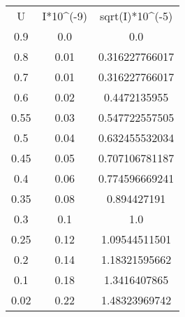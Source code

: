\begin{table}
\begin{tabular}{ccc}
U & I*10^(-9) & sqrt(I)*10^(-5) \\
0.9 & 0.0 & 0.0 \\
0.8 & 0.01 & 0.316227766017 \\
0.7 & 0.01 & 0.316227766017 \\
0.6 & 0.02 & 0.4472135955 \\
0.55 & 0.03 & 0.547722557505 \\
0.5 & 0.04 & 0.632455532034 \\
0.45 & 0.05 & 0.707106781187 \\
0.4 & 0.06 & 0.774596669241 \\
0.35 & 0.08 & 0.894427191 \\
0.3 & 0.1 & 1.0 \\
0.25 & 0.12 & 1.09544511501 \\
0.2 & 0.14 & 1.18321595662 \\
0.1 & 0.18 & 1.3416407865 \\
0.02 & 0.22 & 1.48323969742 \\
\end{tabular}
\end{table}
